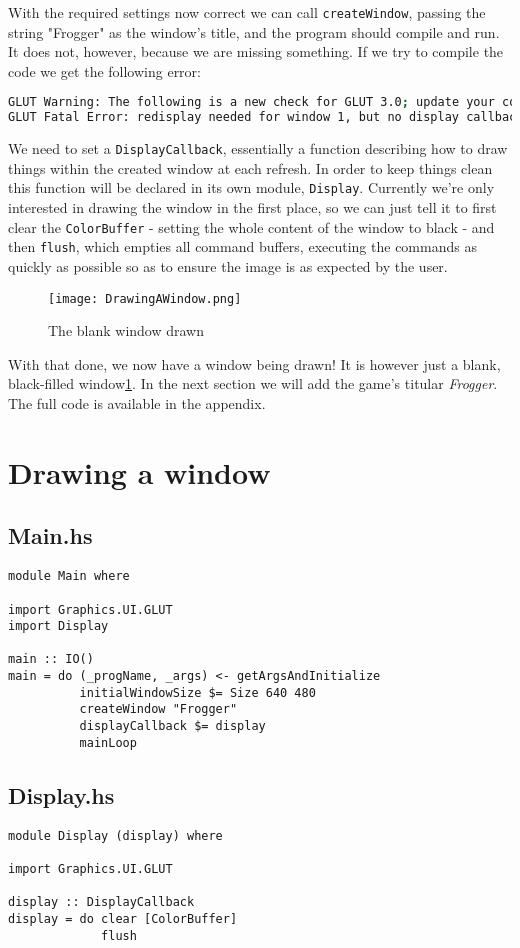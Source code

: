 \documentclass[12pt, a4paper]{report}
\begin{document}
\par

With the required settings now correct we can call \verb|createWindow|, passing the string "Frogger" as the window's title, and the program should compile and run.
It does not, however, because we are missing something.
If we try to compile the code we get the following error:

\begin{lstlisting}[language=sh, xleftmargin=-0.1\textwidth, xrightmargin=-0.1\textwidth]
GLUT Warning: The following is a new check for GLUT 3.0; update your code.
GLUT Fatal Error: redisplay needed for window 1, but no display callback.
\end{lstlisting}

We need to set a \verb|DisplayCallback|, essentially a function describing how to draw things within the created window at each refresh.
In order to keep things clean this function will be declared in its own module, \verb|Display|.
Currently we're only interested in drawing the window in the first place, so we can just tell it to first clear the \verb|ColorBuffer| - setting the whole content of the window to black - and then \verb|flush|, which empties all command buffers, executing the commands as quickly as possible so as to ensure the image is as expected by the user.

\par

\begin{figure}[ht]
  \centering
  \caption{The blank window drawn}
  \texttt{[image: DrawingAWindow.png]}
  \label{fig:drawingawindow}
\end{figure}


With that done, we now have a window being drawn!
It is however just a blank, black-filled window\ref{fig:drawingawindow}.
In the next section we will add the game's titular \textit{Frogger}.
The full code is available in the appendix.

\appendix

\section{Drawing a window}
\subsection{Main.hs}
\begin{lstlisting}
module Main where

import Graphics.UI.GLUT
import Display

main :: IO()
main = do (_progName, _args) <- getArgsAndInitialize
          initialWindowSize $= Size 640 480
          createWindow "Frogger"
          displayCallback $= display
          mainLoop
\end{lstlisting}

\subsection{Display.hs}
\begin{lstlisting}
module Display (display) where

import Graphics.UI.GLUT

display :: DisplayCallback
display = do clear [ColorBuffer]
             flush
\end{lstlisting}
\end{document}
